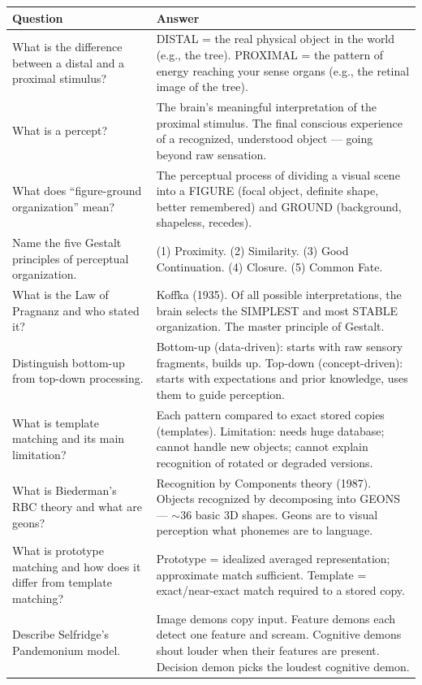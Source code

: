 \documentclass[11pt,a4paper]{article}
\newcommand{\bb}[1]{\textbf{#1}}
\begin{document}
\begin{center}
\renewcommand{\arraystretch}{1.5}
\begin{tabular}{|L{5.5cm}|L{9.7cm}|}
\hline
{}\color{white}\bb{Question} & \color{white}\bb{Answer} \\
\hline
What is the difference between a distal and a proximal stimulus? & DISTAL = the real physical object in the world (e.g., the tree). PROXIMAL = the pattern of energy reaching your sense organs (e.g., the retinal image of the tree). \\
What is a percept? & The brain's meaningful interpretation of the proximal stimulus. The final conscious experience of a recognized, understood object --- going beyond raw sensation. \\
What does ``figure-ground organization'' mean? & The perceptual process of dividing a visual scene into a FIGURE (focal object, definite shape, better remembered) and GROUND (background, shapeless, recedes). \\
Name the five Gestalt principles of perceptual organization. & (1) Proximity. (2) Similarity. (3) Good Continuation. (4) Closure. (5) Common Fate. \\
What is the Law of Pragnanz and who stated it? & Koffka (1935). Of all possible interpretations, the brain selects the SIMPLEST and most STABLE organization. The master principle of Gestalt. \\
Distinguish bottom-up from top-down processing. & Bottom-up (data-driven): starts with raw sensory fragments, builds up. Top-down (concept-driven): starts with expectations and prior knowledge, uses them to guide perception. \\
What is template matching and its main limitation? & Each pattern compared to exact stored copies (templates). Limitation: needs huge database; cannot handle new objects; cannot explain recognition of rotated or degraded versions. \\
What is Biederman's RBC theory and what are geons? & Recognition by Components theory (1987). Objects recognized by decomposing into GEONS --- $\sim$36 basic 3D shapes. Geons are to visual perception what phonemes are to language. \\
What is prototype matching and how does it differ from template matching? & Prototype = idealized averaged representation; approximate match sufficient. Template = exact/near-exact match required to a stored copy. \\
Describe Selfridge's Pandemonium model. & Image demons copy input. Feature demons each detect one feature and scream. Cognitive demons shout louder when their features are present. Decision demon picks the loudest cognitive demon. \\

\end{tabular}
\end{center}
\end{document}
